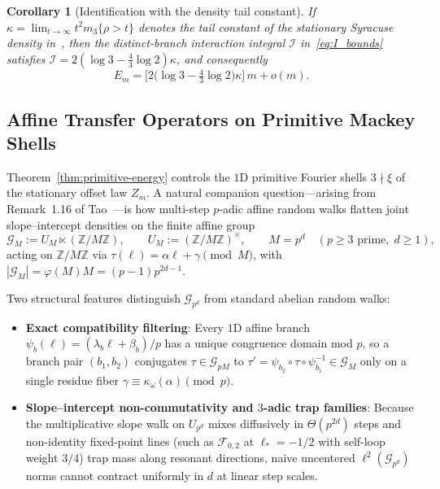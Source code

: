 \documentclass[11pt,a4paper]{article}
\numberwithin{equation}{section}
\newtheorem{corollary}[theorem]{Corollary}
\theoremstyle{definition}
\theoremstyle{remark}
\newcommand{\Z}{\mathbb{Z}}
\newcommand{\cG}{\mathcal{G}}
\newcommand{\cF}{\mathcal{F}}
\newcommand{\cI}{\mathcal{I}}
\begin{document}
\begin{corollary}[Identification with the density tail constant]\label{cor:energy-tail-constant}
If $\kappa = \lim_{t \to \infty} t^2 m_3\{\rho > t\}$ denotes the tail constant of the stationary Syracuse density in~\cite[\S 8, (25)]{Weaver2026}, then the distinct-branch interaction integral $\cI$ in~\eqref{eq:I_bounds} satisfies $\cI = 2(\log 3 - \frac{4}{3}\log 2)\kappa$, and consequently
\[
 E_m = \bigl[2\bigl(\log 3 - \tfrac{4}{3}\log 2\bigr)\kappa\bigr]\,m + o(m).
\]
\end{corollary}

\subsection{Affine Transfer Operators on Primitive Mackey Shells}\label{subsec:main_theorems}

Theorem~\ref{thm:primitive-energy} controls the $1$D primitive Fourier shells $3 \nmid \xi$ of the stationary offset law $Z_m$. A natural companion question---arising from Remark~1.16 of Tao~\cite{Tao2019}---is how multi-step $p$-adic affine random walks flatten joint slope--intercept densities on the finite affine group
\[
\cG_M := U_M \ltimes (\Z/M\Z), \qquad U_M := (\Z/M\Z)^\times, \qquad M = p^d \quad (p \ge 3\text{ prime},\; d \ge 1),
\]
acting on $\Z/M\Z$ via $\tau(\ell) = \alpha \ell + \gamma \pmod M$, with $|\cG_M| = \varphi(M)M = (p-1)p^{2d-1}$.

Two structural features distinguish $\cG_{p^d}$ from standard abelian random walks:
\begin{itemize}[leftmargin=2em,topsep=3pt,itemsep=2pt]
\item \textbf{Exact compatibility filtering}: Every $1$D affine branch $\psi_b(\ell) = (\lambda_b \ell + \beta_b)/p$ has a unique congruence domain mod $p$, so a branch pair $(b_1, b_2)$ conjugates $\tau \in \cG_{pM}$ to $\tau' = \psi_{b_2}\circ\tau\circ\psi_{b_1}^{-1} \in \cG_M$ only on a single residue fiber $\gamma \equiv \kappa_\omega(\alpha) \pmod p$.
\item \textbf{Slope--intercept non-commutativity and $3$-adic trap families}: Because the multiplicative slope walk on $U_{p^d}$ mixes diffusively in $\Theta(p^{2d})$ steps and non-identity fixed-point lines (such as $\cF_{0,2}$ at $\ell_* = -1/2$ with self-loop weight $3/4$) trap mass along resonant directions, naive uncentered $\ell^2(\cG_{p^d})$ norms cannot contract uniformly in $d$ at linear step scales.
\end{itemize}
\end{document}
